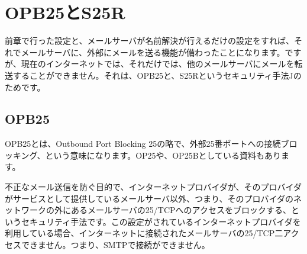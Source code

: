 \section{OPB25とS25R}
前章で行った設定と、メールサーバが名前解決が行えるだけの設定をすれば、それでメールサーバに、外部にメールを送る機能が備わったことになります。ですが、現在のインターネットでは、それだけでは、他のメールサーバにメールを転送することができません。それは、OPB25と、S25Rというセキュリティ手法Jのためです。

\subsection{OPB25}
OPB25とは、Outbound Port Blocking 25の略で、外部25番ポートへの接続ブロッキング、という意味になります。OP25や、OP25Bとしている資料もあります。

不正なメール送信を防ぐ目的で、インターネットプロバイダが、そのプロバイダがサービスとして提供しているメールサーバ以外、つまり、そのプロバイダのネットワークの外にあるメールサーバの25/TCPへのアクセスをブロックする、というセキュリティ手法です。この設定がされているインターネットプロバイダを利用している場合、インターネットに接続されたメールサーバの25/TCP二アクセスできません。つまり、SMTPで接続ができません。

